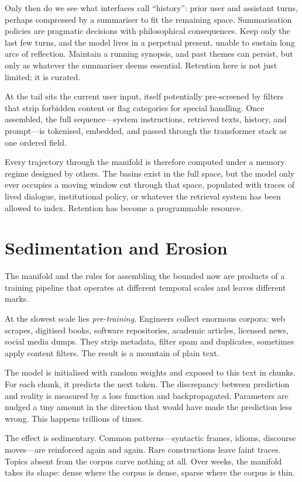 \documentclass[12pt,a4paper]{article}
\begin{document}
Only then do we see what interfaces call ``history'': prior user and assistant turns, perhaps compressed by a summariser to fit the remaining space. Summarisation policies are pragmatic decisions with philosophical consequences. Keep only the last few turns, and the model lives in a perpetual present, unable to sustain long arcs of reflection. Maintain a running synopsis, and past themes can persist, but only as whatever the summariser deems essential. Retention here is not just limited; it is curated.

At the tail sits the current user input, itself potentially pre-screened by filters that strip forbidden content or flag categories for special handling. Once assembled, the full sequence---system instructions, retrieved texts, history, and prompt---is tokenised, embedded, and passed through the transformer stack as one ordered field.

Every trajectory through the manifold is therefore computed under a memory regime designed by others. The basins exist in the full space, but the model only ever occupies a moving window cut through that space, populated with traces of lived dialogue, institutional policy, or whatever the retrieval system has been allowed to index. Retention has become a programmable resource.

\section{Sedimentation and Erosion}

The manifold and the rules for assembling the bounded now are products of a training pipeline that operates at different temporal scales and leaves different marks.

At the slowest scale lies \emph{pre-training}. Engineers collect enormous corpora: web scrapes, digitised books, software repositories, academic articles, licensed news, social media dumps. They strip metadata, filter spam and duplicates, sometimes apply content filters. The result is a mountain of plain text.

The model is initialised with random weights and exposed to this text in chunks. For each chunk, it predicts the next token. The discrepancy between prediction and reality is measured by a loss function and backpropagated. Parameters are nudged a tiny amount in the direction that would have made the prediction less wrong. This happens trillions of times.

The effect is sedimentary. Common patterns---syntactic frames, idioms, discourse moves---are reinforced again and again. Rare constructions leave faint traces. Topics absent from the corpus carve nothing at all. Over weeks, the manifold takes its shape: dense where the corpus is dense, sparse where the corpus is thin.
\end{document}

